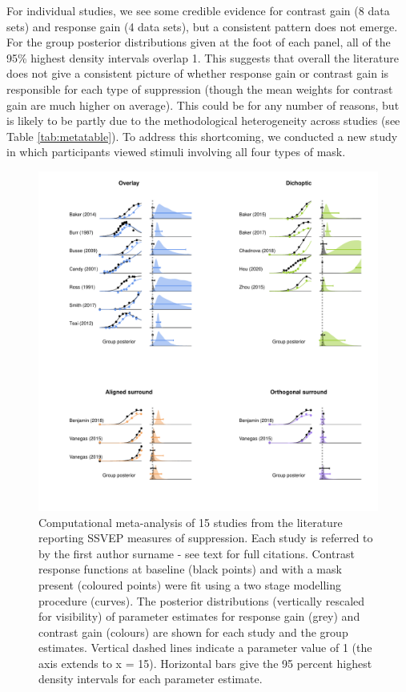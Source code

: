 \documentclass[]{article}
\begin{document}
For individual studies, we see some credible evidence for contrast gain (8 data sets) and response gain (4 data sets), but a consistent pattern does not emerge. For the group posterior distributions given at the foot of each panel, all of the 95\% highest density intervals overlap 1. This suggests that overall the literature does not give a consistent picture of whether response gain or contrast gain is responsible for each type of suppression (though the mean weights for contrast gain are much higher on average). This could be for any number of reasons, but is likely to be partly due to the methodological heterogeneity across studies (see Table \ref{tab:metatable}). To address this shortcoming, we conducted a new study in which participants viewed stimuli involving all four types of mask.

\begin{figure}

{\centering \includegraphics{figures/metaanalysis} 

}

\caption{Computational meta-analysis of 15 studies from the literature reporting SSVEP measures of suppression. Each study is referred to by the first author surname - see text for full citations. Contrast response functions at baseline (black points) and with a mask present (coloured points) were fit using a two stage modelling procedure (curves). The posterior distributions (vertically rescaled for visibility) of parameter estimates for response gain (grey) and contrast gain (colours) are shown for each study and the group estimates. Vertical dashed lines indicate a parameter value of 1 (the axis extends to x = 15). Horizontal bars give the 95 percent highest density intervals for each parameter estimate.}\label{fig:metaanalysis}
\end{figure}
\end{document}
